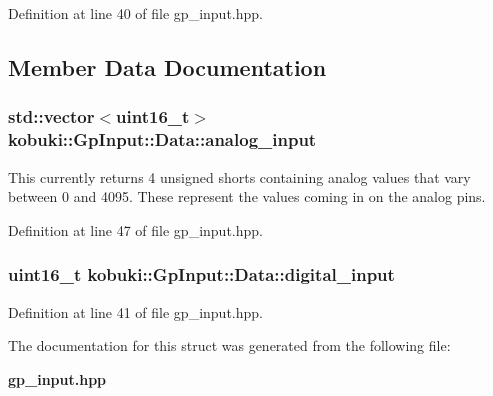 \-Definition at line 40 of file gp\-\_\-input.\-hpp.



\subsection{\-Member \-Data \-Documentation}
\subsubsection[{analog\-\_\-input}]{\setlength{\rightskip}{0pt plus 5cm}std\-::vector$<$uint16\-\_\-t$>$ {\bf kobuki\-::\-Gp\-Input\-::\-Data\-::analog\-\_\-input}}\label{structkobuki_1_1GpInput_1_1Data_a5a77ebbf4e04790e65f1bfb9a935db70}
\-This currently returns 4 unsigned shorts containing analog values that vary between 0 and 4095. \-These represent the values coming in on the analog pins. 

\-Definition at line 47 of file gp\-\_\-input.\-hpp.

\subsubsection[{digital\-\_\-input}]{\setlength{\rightskip}{0pt plus 5cm}uint16\-\_\-t {\bf kobuki\-::\-Gp\-Input\-::\-Data\-::digital\-\_\-input}}\label{structkobuki_1_1GpInput_1_1Data_a4d91ec153b1310b7ef99af7f61850906}


\-Definition at line 41 of file gp\-\_\-input.\-hpp.



\-The documentation for this struct was generated from the following file\-:\begin{DoxyCompactItemize}
\item 
{\bf gp\-\_\-input.\-hpp}\end{DoxyCompactItemize}
